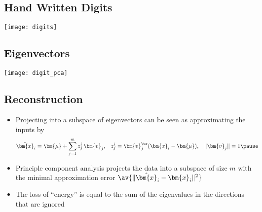 
\begin{slide}
\section{Hand Written Digits}

\begin{center}
  \texttt{[image: digits]}
\end{center}
\end{slide}


\begin{slide}
\section{Eigenvectors}

\begin{center}
  \texttt{[image: digit\_pca]}
\end{center}
\end{slide}


\begin{slide}
\section[-2]{Reconstruction}

\begin{PauseHighLight}
  \begin{itemize}
  \item Projecting into a subspace of eigenvectors can be seen as
    approximating the inputs by
    \begin{align*}
      \hat{\bm{x}}_i  &= \bm{\mu} + \sum_{j=1}^m z_j^i\,\bm{v}_j , &
      z_j^i &= \bm{v}_j^\tr (\bm{x}_i-\bm{\mu}), &  \|\bm{v}_j\|&=1    \pause
    \end{align*}
  \item Principle component analysis projects the data into a subspace
    of size $m$ with the minimal approximation error
    $\av{\|\hat{\bm{x}}_i-\bm{x}_i\|^2}$ \pause
    \item The loss of ``energy'' is equal to the sum of the eigenvalues
      in the directions that are ignored\pause
  \end{itemize}
\end{PauseHighLight}

\end{slide}


